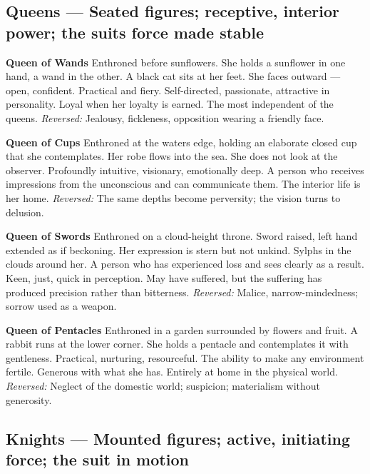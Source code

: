 \subsection{Queens --- Seated figures; receptive, interior power; the suit\textquotesingle s force made stable}\label{queens--seated-figures-receptive-interior-power-the-suits-force-made-stable}

\textbf{Queen of Wands} Enthroned before sunflowers. She holds a sunflower in one hand, a wand in the other. A black cat sits at her feet. She faces outward --- open, confident. Practical and fiery. Self-directed, passionate, attractive in personality. Loyal when her loyalty is earned. The most independent of the queens. \emph{Reversed:} Jealousy, fickleness, opposition wearing a friendly face.

\textbf{Queen of Cups} Enthroned at the water\textquotesingle s edge, holding an elaborate closed cup that she contemplates. Her robe flows into the sea. She does not look at the observer. Profoundly intuitive, visionary, emotionally deep. A person who receives impressions from the unconscious and can communicate them. The interior life is her home. \emph{Reversed:} The same depths become perversity; the vision turns to delusion.

\textbf{Queen of Swords} Enthroned on a cloud-height throne. Sword raised, left hand extended as if beckoning. Her expression is stern but not unkind. Sylphs in the clouds around her. A person who has experienced loss and sees clearly as a result. Keen, just, quick in perception. May have suffered, but the suffering has produced precision rather than bitterness. \emph{Reversed:} Malice, narrow-mindedness; sorrow used as a weapon.

\textbf{Queen of Pentacles} Enthroned in a garden surrounded by flowers and fruit. A rabbit runs at the lower corner. She holds a pentacle and contemplates it with gentleness. Practical, nurturing, resourceful. The ability to make any environment fertile. Generous with what she has. Entirely at home in the physical world. \emph{Reversed:} Neglect of the domestic world; suspicion; materialism without generosity.

\subsection{Knights --- Mounted figures; active, initiating force; the suit in motion}\label{knights--mounted-figures-active-initiating-force-the-suit-in-motion}

